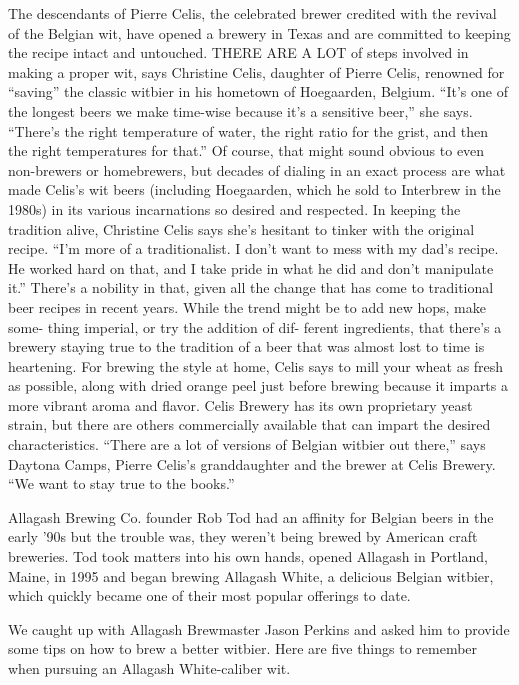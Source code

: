 \documentclass[a4paper,parskip=half]{scrartcl}
\begin{document}
The descendants of Pierre Celis,
the celebrated brewer credited with
the revival of the Belgian wit, have
opened a brewery in Texas and are
committed to keeping the recipe
intact and untouched.
THERE ARE A LOT of steps involved
in making a proper wit, says Christine
Celis, daughter of Pierre Celis, renowned
for “saving” the classic witbier in his
hometown of Hoegaarden, Belgium.
“It’s one of the longest beers we make
time-wise because it’s a sensitive beer,”
she says. “There’s the right temperature
of water, the right ratio for the grist, and
then the right temperatures for that.”
Of course, that might sound obvious to
even non-brewers or homebrewers, but
decades of dialing in an exact process are
what made Celis’s wit beers (including
Hoegaarden, which he sold to Interbrew
in the 1980s) in its various incarnations so
desired and respected.
In keeping the tradition alive, Christine
Celis says she’s hesitant to tinker with the
original recipe.
“I’m more of a traditionalist. I don’t want
to mess with my dad’s recipe. He worked
hard on that, and I take pride in what he
did and don’t manipulate it.”
There’s a nobility in that, given all the
change that has come to traditional beer
recipes in recent years. While the trend
might be to add new hops, make some-
thing imperial, or try the addition of dif-
ferent ingredients, that there’s a brewery
staying true to the tradition of a beer that
was almost lost to time is heartening.
For brewing the style at home, Celis says
to mill your wheat as fresh as possible,
along with dried orange peel just before
brewing because it imparts a more vibrant
aroma and flavor. Celis Brewery has its
own proprietary yeast strain, but there are
others commercially available that can
impart the desired characteristics.
“There are a lot of versions of Belgian
witbier out there,” says Daytona Camps,
Pierre Celis’s granddaughter and the
brewer at Celis Brewery. “We want to stay
true to the books.”

\parencite{HBA2014}

Allagash Brewing Co. founder Rob Tod had an affinity for Belgian beers in the early ’90s but the trouble was, they weren’t being brewed by American craft breweries. Tod took matters into his own hands, opened Allagash in Portland, Maine, in 1995 and began brewing Allagash White, a delicious Belgian witbier, which quickly became one of their most popular offerings to date.

We caught up with Allagash Brewmaster Jason Perkins and asked him to provide some tips on how to brew a better witbier. Here are five things to remember when pursuing an Allagash White-caliber wit.
\end{document}
